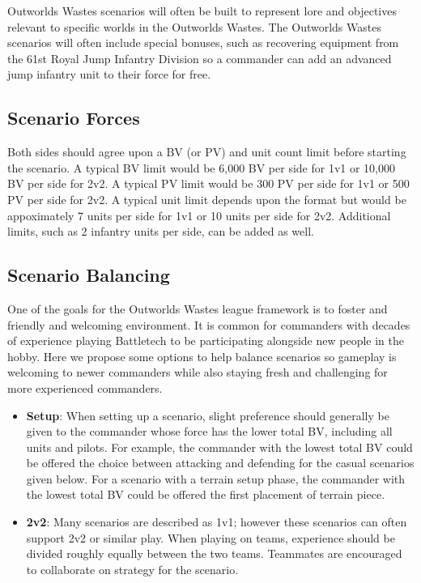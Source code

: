 \documentclass[UTF8]{article}
\begin{document}
Outworlds Wastes scenarios will often be built to represent lore and objectives relevant to specific worlds in the Outworlds Wastes.
The Outworlds Wastes scenarios will often include special bonuses, such as recovering equipment from the 61st Royal Jump Infantry Division so a commander can add an advanced jump infantry unit to their force for free.\\

\subsection{Scenario Forces}

Both sides should agree upon a BV (or PV) and unit count limit before starting the scenario.
A typical BV limit would be 6,000 BV per side for 1v1 or 10,000 BV per side for 2v2.
A typical PV limit would be 300 PV per side for 1v1 or 500 PV per side for 2v2.
A typical unit limit depends upon the format but would be appoximately 7 units per side for 1v1 or 10 units per side for 2v2.
Additional limits, such as 2 infantry units per side, can be added as well.\\

\subsection{Scenario Balancing}

One of the goals for the Outworlds Wastes league framework is to foster and friendly and welcoming environment.
It is common for commanders with decades of experience playing Battletech to be participating alongside new people in the hobby.
Here we propose some options to help balance scenarios so gameplay is welcoming to newer commanders while also staying fresh and challenging for more experienced commanders.\\

\begin{itemize}

\item {\bf Setup}: When setting up a scenario, slight preference should generally be given to the commander whose force has the lower total BV, including all units and pilots.
For example, the commander with the lowest total BV could be offered the choice between attacking and defending for the casual scenarios given below.
For a scenario with a terrain setup phase, the commander with the lowest total BV could be offered the first placement of terrain piece.

\item {\bf 2v2}: Many scenarios are described as 1v1; however these scenarios can often support 2v2 or similar play.
When playing on teams, experience should be divided roughly equally between the two teams.
Teammates are encouraged to collaborate on strategy for the scenario.

\end{itemize}
\end{document}
